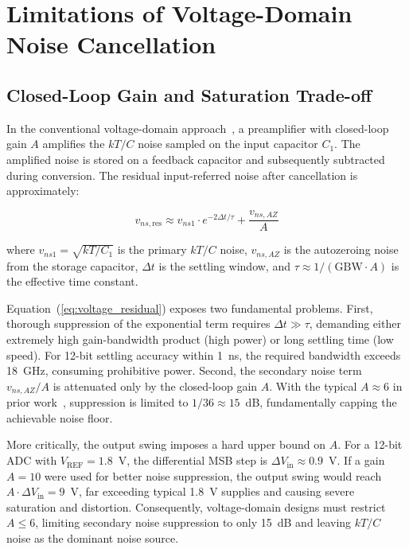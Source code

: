 \documentclass[journal]{IEEEtran}
\begin{document}
\section{Limitations of Voltage-Domain Noise Cancellation}
\label{sec:voltage_limits}

\subsection{Closed-Loop Gain and Saturation Trade-off}

In the conventional voltage-domain approach~\cite{liu202013bit,kapusta2014sampling}, a preamplifier with closed-loop gain $A$ amplifies the $kT/C$ noise sampled on the input capacitor $C_1$. The amplified noise is stored on a feedback capacitor and subsequently subtracted during conversion. The residual input-referred noise after cancellation is approximately:

\begin{equation}
v_{ns,\text{res}} \approx v_{ns1} \cdot e^{-2\Delta t/\tau} + \frac{v_{ns,AZ}}{A}
\label{eq:voltage_residual}
\end{equation}

where $v_{ns1} = \sqrt{kT/C_1}$ is the primary $kT/C$ noise, $v_{ns,AZ}$ is the autozeroing noise from the storage capacitor, $\Delta t$ is the settling window, and $\tau \approx 1/(\text{GBW}\cdot A)$ is the effective time constant.

Equation~(\ref{eq:voltage_residual}) exposes two fundamental problems. First, thorough suppression of the exponential term requires $\Delta t \gg \tau$, demanding either extremely high gain-bandwidth product (high power) or long settling time (low speed). For 12-bit settling accuracy within 1~ns, the required bandwidth exceeds 18~GHz, consuming prohibitive power. Second, the secondary noise term $v_{ns,AZ}/A$ is attenuated only by the closed-loop gain $A$. With the typical $A\approx 6$ in prior work~\cite{liu202013bit}, suppression is limited to $1/36\approx 15$~dB, fundamentally capping the achievable noise floor.

More critically, the output swing imposes a hard upper bound on $A$. For a 12-bit ADC with $V_{\text{REF}}=1.8$~V, the differential MSB step is $\Delta V_{\text{in}}\approx 0.9$~V. If a gain $A=10$ were used for better noise suppression, the output swing would reach $A\cdot\Delta V_{\text{in}}=9$~V, far exceeding typical 1.8~V supplies and causing severe saturation and distortion. Consequently, voltage-domain designs must restrict $A\leq 6$, limiting secondary noise suppression to only 15~dB and leaving $kT/C$ noise as the dominant noise source.
\end{document}
